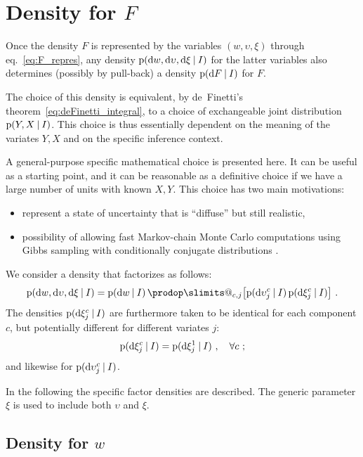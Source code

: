 \documentclass[\ifafour a4paper,12pt,\else a5paper,10pt,\fi%
onecolumn,oneside,article,%
british%
]{memoir}
\makeatletter
\theoremstyle{remark}
\theoremstyle{innote}
\def\prod{\DOTSI\prodop\slimits@}
\newcommand*{\di}{\mathrm{d}}%
\newcommand*{\p}{\mathrm{p}}%
\renewcommand*{\|}[1][]{\nonscript\:#1\vert\nonscript\:\mathopen{}}
\newcommand*{\eqn}{eq.}%
\newcommand*{\cf}{{cf.}}
\makeatother
\begin{document}
\section{Density for $F$}
\label{sec:density_F}

Once the density $F$ is represented by the variables $(w, \upsilon, \xi)$ through \eqn~\eqref{eq:F_repres}, any density $\p(\di w, \di\upsilon, \di\xi \|I)$ for the latter variables also determines (possibly by pull-back) a density $\p(\di F \| I)$ for $F$.

The choice of this density is equivalent, by de~Finetti's theorem~\eqref{eq:deFinetti_integral}, to a choice of exchangeable joint distribution $\p(Y, X \|I)$. This choice is thus essentially dependent on the meaning of the variates $Y,X$ and on the specific inference context.

A general-purpose specific mathematical choice is presented here. It can be useful as a starting point, and it can be reasonable as a definitive choice if we have a large number of units with known $X,Y$. %
This choice has two main motivations:
\begin{itemize}
\item represent a state of uncertainty that is \enquote{diffuse} but still realistic,
\item possibility of allowing fast Markov-chain Monte Carlo computations using Gibbs sampling with conditionally conjugate distributions \autocites[\cf][]{goerueretal2010}.
\end{itemize}

We consider a density that factorizes as follows:
\begin{equation}
  \label{eq:density_factorizes}
  \p(\di w, \di\upsilon, \di\xi \|I) =
  \p(\di w \|I)\,
  \prod_{c,j}\bigl[\p(\di\upsilon^{c}_{j} \|I)\,
  \p(\di\xi^{c}_{j} \|I) \bigr] \ .
\end{equation}
The densities $\p(\di\xi^{c}_{j} \|I)$ are furthermore taken to be identical for each component $c$, but potentially different for different variates $j$:
\begin{equation}
  \label{eq:density_same_c}
  \p(\di\xi^{c}_{j} \|I) = \p(\di\xi^{1}_{j} \|I) \ ,\quad\forall c \ ;
\end{equation}
and likewise for $\p(\di\upsilon^{c}_{j} \|I)$.

In the following the specific factor densities are described. The generic parameter $\xi$ is used to include both $\upsilon$ and $\xi$.

\subsection{Density for $w$}
\label{sec:params_w}
\end{document}
